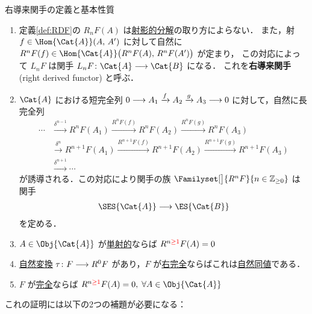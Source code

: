 \documentclass[algtopo_main]{subfiles}
\begin{document}
\begin{myprop}[label=def:RDF-basic, breakable]{右導来関手の定義と基本性質}
    \begin{enumerate}
        \item 定義\ref{def:RDF}の $R_nF(A)$ は\hyperref[def:injective-resolution]{射影的分解}の取り方によらない．
        また，射 $f \in \Hom{\Cat{A}}(A,\, A')$ に対して自然に $R^n F(f) \in \Hom{\Cat{A}}\bigl(R^nF(A),\, R^nF(A') \bigr)$ が定まり，
        この対応によって $L_n F$ は関手 $L_n F \colon \Cat{A} \lto \Cat{B}$ になる．
        これを\textbf{右導来関手} (right derived functor) と呼ぶ．
        \item $\Cat{A}$ における短完全列 $0\longrightarrow A_1 \xrightarrow{f} A_2 \xrightarrow{g} A_3 \longrightarrow 0$ に対して，自然に長完全列
        \begin{align}
            \cdots &\xrightarrow{\delta^{n-1}} R^nF(A_1) \xrightarrow{R^n F(f)} R^nF(A_2) \xrightarrow{R^nF(g)} R^nF(A_3) \\
                &\xrightarrow{\delta^{n}} R^{n+1}F(A_1) \xrightarrow{R^{n+1}F(f)} R^{n+1}F(A_2) \xrightarrow{R^{n+1}F(g)} R^{n+1}F(A_3) \\
                &\xrightarrow{\delta^{n+1}} \cdots 
        \end{align}
        が誘導される．この対応により関手の族 $\Familyset[\big]{R^nF}{n \in \mathbb{Z}_{\ge 0}}$ は関手
        \begin{align}
            \SES{\Cat{A}} \lto \ES{\Cat{B}}
        \end{align}
        を定める．
        \item $A \in \Obj{\Cat{A}}$ が\hyperref[def:inj-mod]{単射的}ならば $R^{n \textcolor{red}{\ge 1}}F(A) = 0$
        \item \hyperref[def:nat]{自然変換} $\tau\colon F \longrightarrow R^0 F$ があり，$F$ が\hyperref[def:Ab-func]{右完全}ならばこれは\hyperref[def:naturallyeq]{自然同値}である．
        \item $F$ が\hyperref[def:Ab-func]{完全}ならば $R^{n \textcolor{red}{\ge 1}}F(A) = 0,\; \forall A \in \Obj{\Cat{A}}$
    \end{enumerate}
\end{myprop}

これの証明には以下の2つの補題が必要になる：
\end{document}
